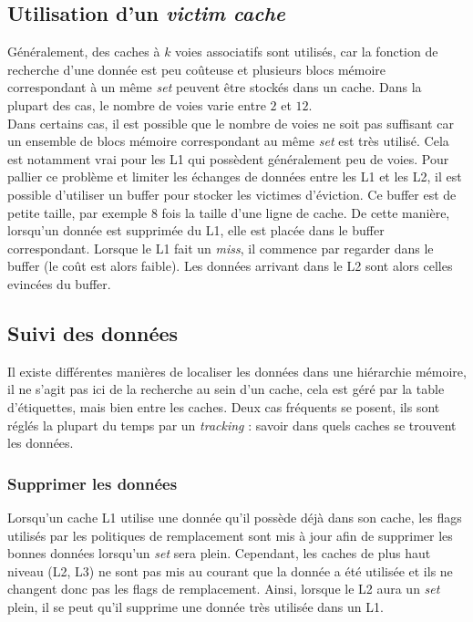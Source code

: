 \subsection{Utilisation d'un \textit{victim cache}}
Généralement, des caches à $k$ voies associatifs sont utilisés, car la fonction de recherche d'une donnée est peu coûteuse et plusieurs blocs mémoire correspondant à un même \textit{set} peuvent être stockés dans un cache. Dans la plupart des cas, le nombre de voies varie entre $2$ et $12$. \\

Dans certains cas, il est possible que le nombre de voies ne soit pas suffisant car un ensemble de blocs mémoire correspondant au même \textit{set} est très utilisé. Cela est notamment vrai pour les L1 qui possèdent généralement peu de voies. Pour pallier ce problème et limiter les échanges de données entre les L1 et les L2, il est possible d'utiliser un buffer pour stocker les victimes d'éviction. Ce buffer est de petite taille, par exemple $8$ fois la taille d'une ligne de cache. De cette manière, lorsqu'un donnée est supprimée du L1, elle est placée dans le buffer correspondant. Lorsque le L1 fait un \textit{miss}, il commence par regarder dans le buffer (le coût est alors faible). Les données arrivant dans le L2 sont alors celles evincées du buffer.

\subsection{Suivi des données}
 Il existe différentes manières de localiser les données dans une hiérarchie mémoire, il ne s'agit pas ici de la recherche au sein d'un cache, cela est géré par la table d'étiquettes, mais bien entre les caches. Deux cas fréquents se posent, ils sont réglés la plupart du temps par un \textit{tracking} : savoir dans quels caches se trouvent les données.

\subsubsection{Supprimer les données}
Lorsqu'un cache L1 utilise une donnée qu'il possède déjà dans son cache, les flags utilisés par les politiques de remplacement sont mis à jour afin de supprimer les bonnes données lorsqu'un \textit{set} sera plein. Cependant, les caches de plus haut niveau (L2, L3) ne sont pas mis au courant que la donnée a été utilisée et ils ne changent donc pas les flags de remplacement. Ainsi, lorsque le L2 aura un \textit{set} plein, il se peut qu'il supprime une donnée très utilisée dans un L1. \\

